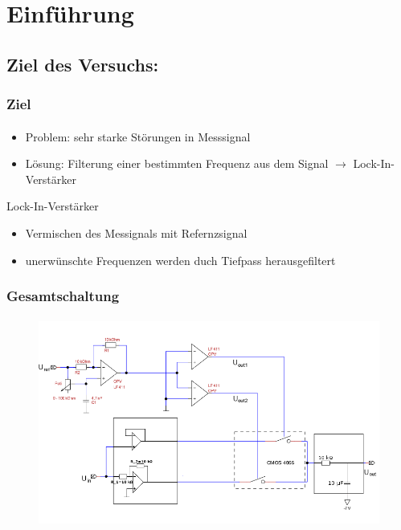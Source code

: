 \section{Einführung} %
\label{sec:Einführung}
\subsection{Ziel des Versuchs:} %
\label{sub:Ziel des Versuchs:}
\begin{frame}
    \frametitle{Ziel}
    \framesubtitle{}
    \begin{block}{}
         \begin{itemize}
             \item Problem: sehr starke Störungen in Messsignal
             \item Lösung: Filterung einer bestimmten Frequenz aus dem Signal
             $\rightarrow$ Lock-In-Verstärker
         \end{itemize}
    \end{block}
    \begin{block}{Lock-In-Verstärker}
         \begin{itemize}
             \item Vermischen des Messignals mit Refernzsignal
             \item unerwünschte Frequenzen werden duch Tiefpass herausgefiltert
         \end{itemize}
    \end{block}
\end{frame}
\begin{frame}
    \frametitle{Gesamtschaltung}
    \framesubtitle{}
    \begin{figure}[H]
    \begin{center}
            \includegraphics[scale=0.5]{./img/schaltung/gesamt.png}
    \end{center}
    \end{figure}
\end{frame}
